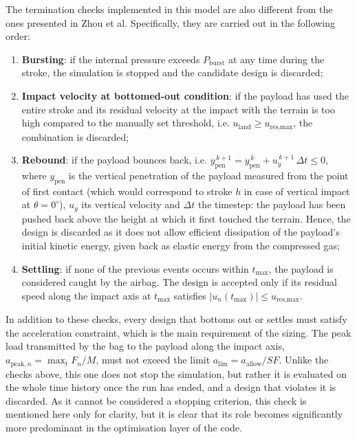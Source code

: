 The termination checks implemented in this model are also different from the ones presented in Zhou et al. Specifically, they are carried out in the following order:
\begin{enumerate}
  \item \textbf{Bursting}: if the internal pressure exceeds $P_\text{burst}$ at any time during the stroke, the simulation is stopped and the candidate design is discarded;
  \item \textbf{Impact velocity at bottomed-out condition}: if the payload has used the entire stroke and its residual velocity at the impact with the terrain is too high compared to the manually set threshold, i.e. $u_\text{land} \ge u_\text{res,max}$, the combination is discarded; 
  \item \textbf{Rebound}: if the payload bounces back, i.e. $y_\text{pen}^{\,k+1} = y_\text{pen}^{\,k} + u_y^{\,k+1}\,\Delta t \le 0$, where $y_\text{pen}$ is the vertical penetration of the payload measured from the point of first contact (which would correspond to stroke $h$ in case of vertical impact at $\theta = 0^{\circ}$), $u_y$ its vertical velocity and $\Delta t$ the timestep: the payload has been pushed back above the height at which it first touched the terrain. Hence, the design is discarded as it does not allow efficient dissipation of the payload's initial kinetic energy, given back as elastic energy from the compressed gas;
  \item \textbf{Settling}: if none of the previous events occurs within $t_\text{max}$, the payload is considered caught by the airbag. The design is accepted only if its residual speed along the impact axis at $t_\text{max}$ satisfies $|u_n(t_\text{max})| \le u_\text{res,max}$.
\end{enumerate}

In addition to these checks, every design that bottoms out or settles must satisfy the acceleration constraint, which is the main requirement of the sizing. The peak load transmitted by the bag to the payload along the impact axis, $a_{\text{peak},n} = \max_t F_n/M$, must not exceed the limit $a_\text{lim} = a_\text{allow}/\mathit{SF}$. Unlike the checks above, this one does not stop the simulation, but rather it is evaluated on the whole time history once the run has ended, and a design that violates it is discarded. As it cannot be considered a stopping criterion, this check is mentioned here only for clarity, but it is clear that its role becomes significantly more predominant in the optimisation layer of the code.

